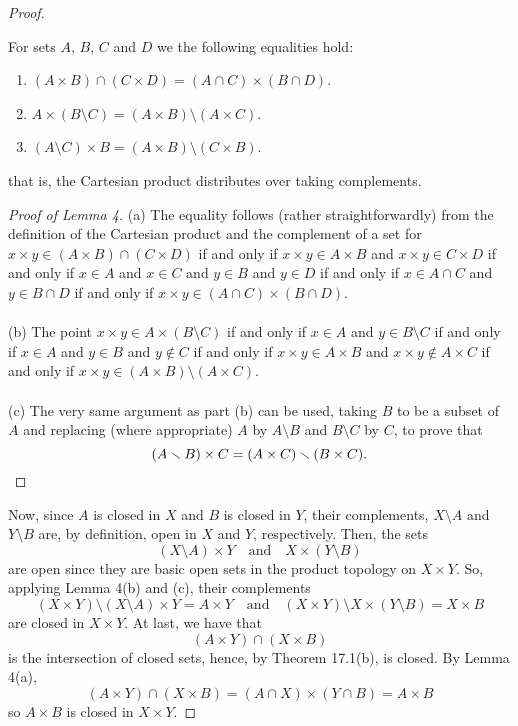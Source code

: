 \begin{proof}
\begin{lemma}
For sets $A$, $B$, $C$ and $D$ we the following equalities hold:
\begin{enumerate}[noitemsep,label=(\alph*)]
\item $(A\times B)\cap (C\times D)=(A\cap C)\times (B\cap D)$.
\item $A\times (B\setminus C)=(A\times B)\setminus (A\times C)$.
\item $(A\setminus C)\times B=(A\times B)\setminus (C\times B)$.
\end{enumerate}
that is, the Cartesian product distributes over taking
complements.
\end{lemma}
\begin{proof}[Proof of Lemma 4]
\renewcommand\qedsymbol{$\vardiamondsuit$}
(a) The equality follows (rather straightforwardly) from the
definition of the Cartesian product and the complement of a set
for $x\times y\in (A\times B)\cap (C\times D)$ if and only if
$x\times y\in A\times B$ and $x\times y\in C\times D$ if and only
if $x\in A$ and $x\in C$ and $y\in B$ and $y\in D$ if and only if
$x\in A\cap C$ and $y\in B\cap D$ if and only if $x\times y\in
(A\cap C)\times (B\cap D)$.
\\\\
(b) The point $x\times y\in A\times (B\setminus C)$ if and only
if $x\in A$ and $y\in B\setminus C$ if and only if $x\in A$ and
$y\in B$ and $y\notin C$ if and only if $x\times y\in A\times B$
and $x\times y\notin A\times C$ if and only if $x\times y\in
(A\times B)\setminus (A\times C)$.
\\\\
(c) The very same argument as part (b) can be used, taking $B$ to
be a subset of $A$ and replacing (where appropriate) $A$ by
$A\setminus B$ and $B\setminus C$ by $C$, to prove that
\[
(A\setminus B)\times C=(A\times C)\setminus (B\times C).\qedhere
\]
\end{proof}
Now, since $A$ is closed in $X$ and $B$ is closed in $Y$, their
complements, $X\setminus A$ and $Y\setminus B$ are, by
definition, open in $X$ and $Y$, respectively. Then, the sets
\[
(X\setminus A)\times Y
\quad
\text{and}
\quad
X\times (Y\setminus B)
\]
are open since they are basic open sets in the product topology
on $X\times Y$. So, applying Lemma 4(b) and (c), their
complements
\[
(X\times Y)\setminus (X\setminus A)\times Y=A\times Y
\quad
\text{and}
\quad
(X\times Y)\setminus X\times (Y\setminus B)=X\times B
\]
are closed in $X\times Y$. At last, we have that
\[
(A\times Y)\cap (X\times B)
\]
is the intersection of closed sets, hence, by Theorem 17.1(b), is
closed. By Lemma 4(a),
\[
(A\times Y)\cap (X\times B)=(A\cap X)\times (Y\cap B)=A\times B
\]
so $A\times B$ is closed in $X\times Y$.
\end{proof}
